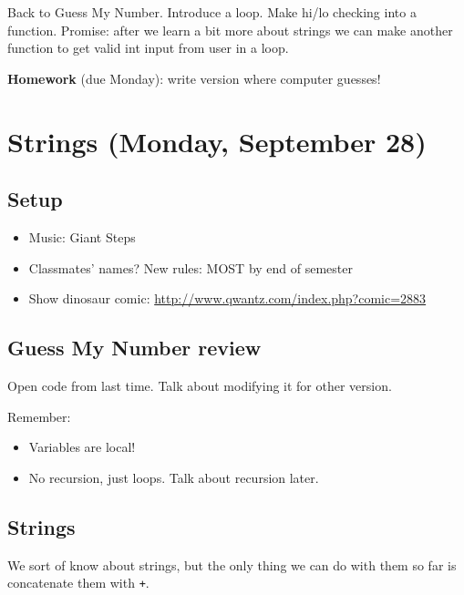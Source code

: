 \documentclass{article}
\begin{document}
Back to Guess My Number.  Introduce a loop.  Make hi/lo checking into
a function.  Promise: after we learn a bit more about strings we can
make another function to get valid int input from user in a loop.

\textbf{Homework} (due Monday): write version where computer guesses!

\section*{Strings (Monday, September 28)}

\subsection*{Setup}
\begin{itemize}
\item Music: Giant Steps
\item Classmates' names?  New rules: MOST by end of semester
\item Show dinosaur comic: \url{http://www.qwantz.com/index.php?comic=2883}
\end{itemize}

\subsection*{Guess My Number review}

Open code from last time.  Talk about modifying it for other version.

Remember:
\begin{itemize}
\item Variables are local!
\item No recursion, just loops.  Talk about recursion later.
\end{itemize}

\subsection*{Strings}

We sort of know about strings, but the only thing we can do with them
so far is concatenate them with \verb|+|.
\end{document}
